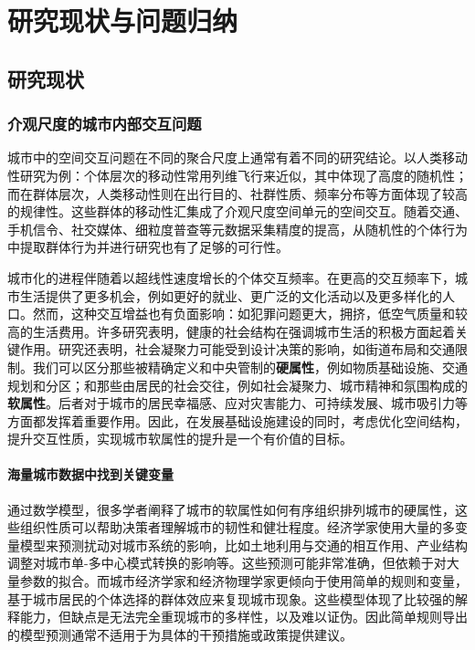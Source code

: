 \chapter{研究现状与问题归纳}

\section{研究现状}

\subsection{介观尺度的城市内部交互问题}

城市中的空间交互问题在不同的聚合尺度上通常有着不同的研究结论。以人类移动性研究为例：个体层次的移动性常用列维飞行来近似\cite{brockmann2006scaling,gonzalez2008understanding,mantegna1994stochastic,metzler2007some}，其中体现了高度的随机性；而在群体层次，人类移动性则在出行目的、社群性质、频率分布等方面体现了较高的规律性\cite{peng2012collective, jiang2017collective, dong2020spectral, wachowicz2016finding}。这些群体的移动性汇集成了介观尺度空间单元的空间交互。随着交通、手机信令、社交媒体、细粒度普查等元数据采集精度的提高，从随机性的个体行为中提取群体行为并进行研究也有了足够的可行性。

城市化的进程伴随着以超线性速度增长的个体交互频率。在更高的交互频率下，城市生活提供了更多机会，例如更好的就业、更广泛的文化活动以及更多样化的人口。然而，这种交互增益也有负面影响：如犯罪问题更大，拥挤，低空气质量和较高的生活费用。许多研究表明，健康的社会结构在强调城市生活的积极方面起着关键作用。研究还表明，社会凝聚力可能受到设计决策的影响，如街道布局和交通限制\cite{appleyard1976liveable, appleyard1980livable}。我们可以区分那些被精确定义和中央管制的\textbf{硬属性}，例如物质基础设施、交通规划和分区；和那些由居民的社会交往，例如社会凝聚力、城市精神和氛围构成的\textbf{软属性}。后者对于城市的居民幸福感、应对灾害能力、可持续发展、城市吸引力等方面都发挥着重要作用。因此，在发展基础设施建设的同时，考虑优化空间结构，提升交互性质，实现城市软属性的提升是一个有价值的目标。

\subsubsection{海量城市数据中找到关键变量}

通过数学模型，很多学者阐释了城市的软属性如何有序组织排列城市的硬属性，这些组织性质可以帮助决策者理解城市的韧性和健壮程度\cite{batty1971modelling, louf2013modeling}。经济学家使用大量的多变量模型来预测扰动对城市系统的影响，比如土地利用与交通的相互作用、产业结构调整对城市单-多中心模式转换的影响等\cite{fujita1982multiple, acheampong2015land}。这些预测可能非常准确，但依赖于对大量参数的拟合。而城市经济学家和经济物理学家更倾向于使用简单的规则和变量，基于城市居民的个体选择的群体效应来复现城市现象。这些模型体现了比较强的解释能力，但缺点是无法完全重现城市的多样性，以及难以证伪。因此简单规则导出的模型预测通常不适用于为具体的干预措施或政策提供建议。

